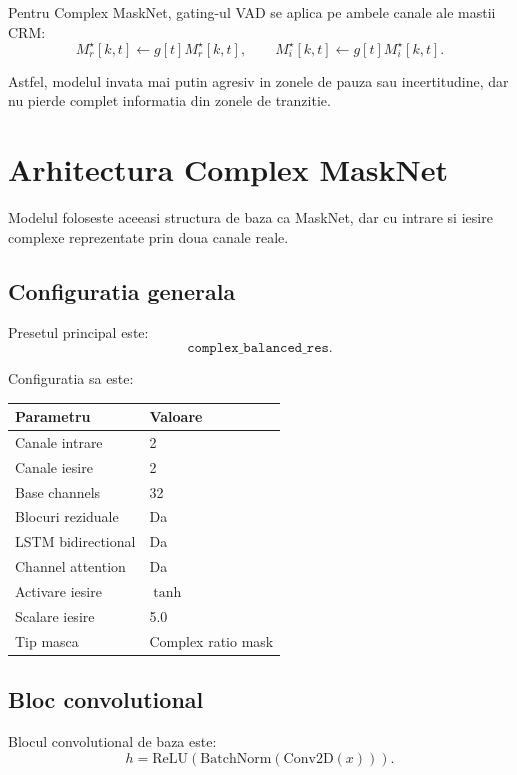 \documentclass[12pt,a4paper]{article}
\begin{document}
Pentru Complex MaskNet, gating-ul VAD se aplica pe ambele canale ale mastii CRM:
\begin{equation}
    M_r^{\star}[k,t] \leftarrow g[t]M_r^{\star}[k,t],
    \qquad
    M_i^{\star}[k,t] \leftarrow g[t]M_i^{\star}[k,t].
\end{equation}

Astfel, modelul invata mai putin agresiv in zonele de pauza sau incertitudine,
dar nu pierde complet informatia din zonele de tranzitie.

\section{Arhitectura Complex MaskNet}

Modelul foloseste aceeasi structura de baza ca MaskNet, dar cu intrare si iesire
complexe reprezentate prin doua canale reale.

\subsection{Configuratia generala}

Presetul principal este:
\begin{equation}
    \texttt{complex\_balanced\_res}.
\end{equation}

Configuratia sa este:
\begin{center}
\begin{tabular}{ll}
\toprule
Parametru & Valoare \\
\midrule
Canale intrare & 2 \\
Canale iesire & 2 \\
Base channels & 32 \\
Blocuri reziduale & Da \\
LSTM bidirectional & Da \\
Channel attention & Da \\
Activare iesire & $\tanh$ \\
Scalare iesire & 5.0 \\
Tip masca & Complex ratio mask \\
\bottomrule
\end{tabular}
\end{center}

\subsection{Bloc convolutional}

Blocul convolutional de baza este:
\begin{equation}
    h = \mathrm{ReLU}(\mathrm{BatchNorm}(\mathrm{Conv2D}(x))).
\end{equation}
\end{document}
